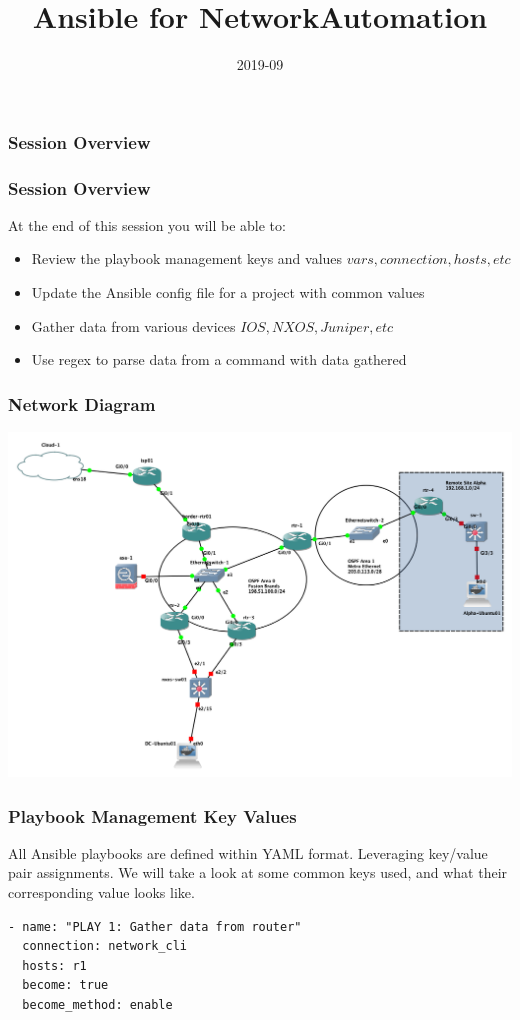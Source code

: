 \documentclass{beamer}
\title{Ansible for NetworkAutomation}
\date{2019-09}
\begin{document}
\frame{\titlepage}

\begin{frame}
    \frametitle{Session Overview}
    \tableofcontents
\end{frame}

\begin{frame}
\frametitle{Session Overview}
At the end of this session you will be able to:
\begin{itemize}
  \item <2-> Review the playbook management keys and values \(vars, connection, hosts, etc\)
  \item <3-> Update the Ansible config file for a project with common values
  \item <4-> Gather data from various devices \(IOS, NXOS, Juniper, etc\)
  \item <5-> Use regex to parse data from a command with data gathered
\end{itemize}
\end{frame}

\begin{frame}
\frametitle{Network Diagram}
\includegraphics[width=\textwidth]{assets/base_setup.png}
\end{frame}



\begin{frame}[fragile]
    \frametitle{Playbook Management Key Values}
    All Ansible playbooks are defined within YAML format. Leveraging key/value
    pair assignments. We will take a look at some common keys used, and what their
    corresponding value looks like.
\begin{verbatim}
- name: "PLAY 1: Gather data from router"
  connection: network_cli
  hosts: r1
  become: true
  become_method: enable
\end{verbatim}
\end{frame}
\end{document}
